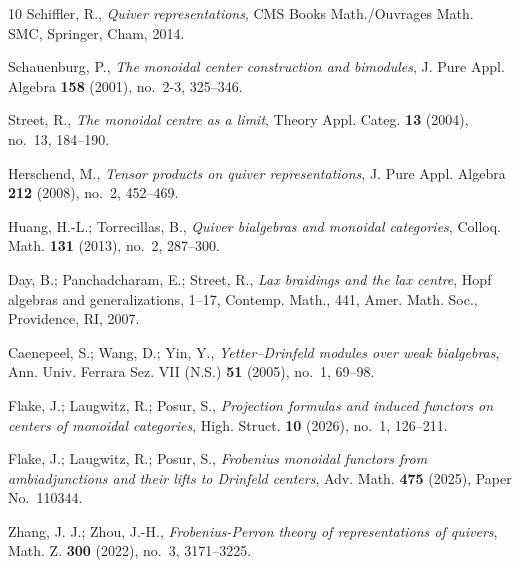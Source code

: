 \documentclass{amsart}
\theoremstyle{definition}
\theoremstyle{remark}
\numberwithin{equation}{section}
\begin{document}
\begin{thebibliography}{10}
Schiffler, R., \emph{Quiver representations}, CMS Books Math./Ouvrages Math.
  SMC, Springer, Cham, 2014.

Schauenburg, P., \emph{The monoidal center construction and bimodules}, J. Pure
  Appl. Algebra \textbf{158} (2001), no.~2-3, 325--346.

Street, R., \emph{The monoidal centre as a limit}, Theory Appl. Categ.
  \textbf{13} (2004), no.~13, 184--190.

Herschend, M., \emph{Tensor products on quiver representations}, J. Pure Appl.
  Algebra \textbf{212} (2008), no.~2, 452--469.

Huang, H.-L.; Torrecillas, B., \emph{Quiver bialgebras and monoidal
  categories}, Colloq. Math. \textbf{131} (2013), no.~2, 287--300.

Day, B.; Panchadcharam, E.; Street, R., \emph{Lax braidings and the lax
  centre}, Hopf algebras and generalizations, 1--17, Contemp. Math., 441,
  Amer. Math. Soc., Providence, RI, 2007.

Caenepeel, S.; Wang, D.; Yin, Y., \emph{Yetter--Drinfeld modules over weak
  bialgebras}, Ann. Univ. Ferrara Sez. VII (N.S.) \textbf{51} (2005), no.~1,
  69--98.

Flake, J.; Laugwitz, R.; Posur, S., \emph{Projection formulas and induced
  functors on centers of monoidal categories}, High. Struct. \textbf{10}
  (2026), no.~1, 126--211.

Flake, J.; Laugwitz, R.; Posur, S., \emph{Frobenius monoidal functors from
  ambiadjunctions and their lifts to Drinfeld centers}, Adv. Math.
  \textbf{475} (2025), Paper No.~110344.

Zhang, J. J.; Zhou, J.-H., \emph{Frobenius-Perron theory of representations of
  quivers}, Math. Z. \textbf{300} (2022), no.~3, 3171--3225.

\end{thebibliography}
\end{document}
